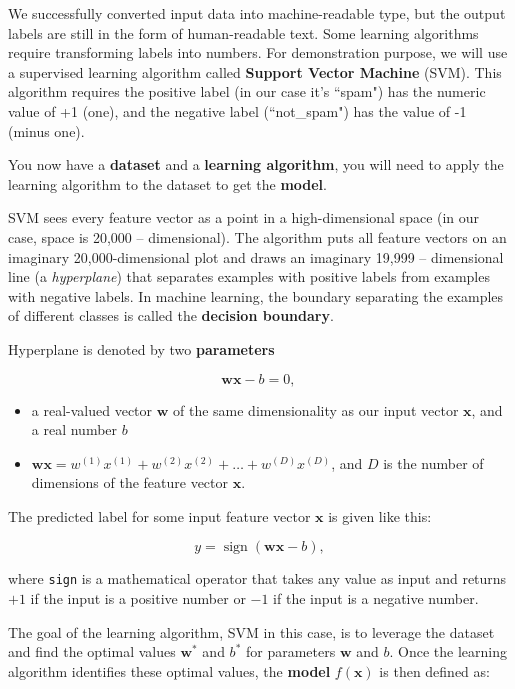 We successfully converted input data into machine-readable type, but the output labels are still in the form of human-readable text. Some learning algorithms require transforming labels into numbers. For demonstration purpose, we will use a supervised learning algorithm called \textbf{Support Vector Machine} (SVM). This algorithm requires the positive label (in our case it's ``spam") has the numeric value of +1 (one), and the negative label (``not\_spam") has the value of -1 (minus one).

You now have a \textbf{dataset} and a \textbf{learning algorithm}, you will need to apply the learning algorithm to the dataset to get the \textbf{model}.

SVM sees every feature vector as a point in a high-dimensional space (in our case, space is 20,000 -- dimensional). The algorithm puts all feature vectors on an imaginary 20,000-dimensional plot and draws an imaginary 19,999 -- dimensional line (a \textit{hyperplane}) that separates examples with positive labels from examples with negative labels. In machine learning, the boundary separating the examples of different classes is called the \textbf{decision boundary}.

Hyperplane is denoted by two \textbf{parameters}

\[ \mathbf{w} \mathbf{x}-b=0 \text {, } \]
\begin{itemize}
	\item a real-valued vector $\mathbf{w}$ of the same dimensionality as our input vector $\mathbf{x}$, and a real number $b$
	\item $\mathbf{w} \mathbf{x}= w^{(1)} x^{(1)}+w^{(2)} x^{(2)}+\ldots+w^{(D)} x^{(D)}$, and $D$ is the number of dimensions of the feature vector $\mathbf{x}$.
\end{itemize}
The predicted label for some input feature vector $\mathbf{x}$ is given like this:

$$
	y=\operatorname{sign}(\mathbf{w} \mathbf{x}-b),
$$

where \verb*|sign| is a mathematical operator that takes any value as input and returns $+1$ if the input is a positive number or $-1$ if the input is a negative number.

The goal of the learning algorithm, SVM in this case, is to leverage the dataset and find the optimal values \(\mathbf{w}^{*}\) and $b^{*}$ for parameters $\mathbf{w}$ and $b$. Once the learning algorithm identifies these optimal values, the \textbf{model} $f(\mathbf{x})$ is then defined as:

